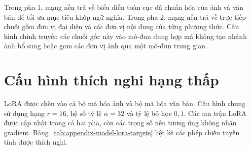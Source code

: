 Trong pha 1, mạng nền trả về biểu diễn toàn cục đã chuẩn hóa của ảnh và văn bản để tối ưu mục tiêu khớp ngữ nghĩa. Trong pha 2, mạng nền trả về trực tiếp chuỗi gồm đơn vị đại diện và các đơn vị nội dung của từng phương thức. Cấu hình chính truyền các chuỗi gốc này vào mô-đun dung hợp mà không tạo nhánh ảnh bổ sung hoặc gom các đơn vị ảnh qua một mô-đun trung gian.

\section{Cấu hình thích nghi hạng thấp}

LoRA \cite{Hu2022LoRA} được chèn vào cả bộ mã hóa ảnh và bộ mã hóa văn bản. Cấu hình chung sử dụng hạng $r=16$, hệ số tỷ lệ $\alpha=32$ và tỷ lệ bỏ học $0{,}1$. Các ma trận LoRA được cập nhật trong cả hai pha, còn các trọng số nền tương ứng không nhận gradient. Bảng~\ref{tab:appendix-model-lora-targets} liệt kê các phép chiếu tuyến tính được thích nghi.

\begin{table}[htbp]
\centering
{}
\caption{Các mô-đun tuyến tính được thích nghi bằng LoRA}
\label{tab:appendix-model-lora-targets}
\end{table}

